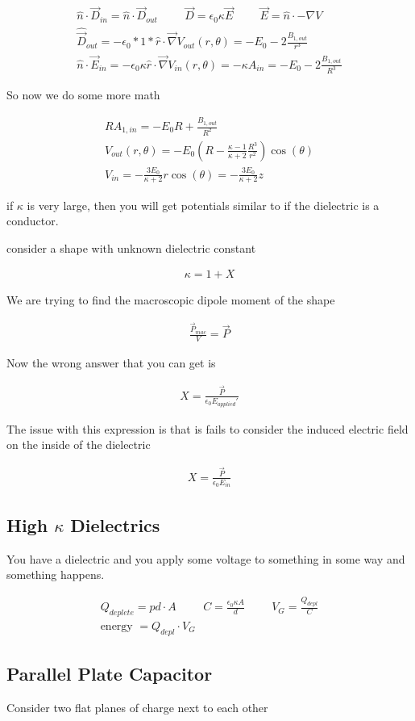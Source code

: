\documentclass[fleqn]{report}
\newcommand{\hp}{\hspace{1cm}}
\newcommand{\equations} [1] {
\begin{gather*}
#1
\end{gather*}
}
\begin{document}
\equations{
    \hat n \cdot \vec D_{in}
    =
    \hat n \cdot \vec D_{out}
    \hp    
    \vec D = \epsilon_0 \kappa \vec E
    \hp
    \vec E = \hat n \cdot - \nabla V
    \\
    \hat \vec D_{out} 
    =
    - \epsilon_0 *1*\hat r \cdot \vec \nabla V_{out}(r, \theta)
    =
    - E_0 - 2 \frac{B_{1, out}}{r^3}
    \\
    \hat n \cdot \vec E_{in} 
    = 
    - \epsilon_0 \kappa \hat r \cdot \vec \nabla V_{in}(r, \theta)
    = 
    - \kappa A_{in}
    = 
    - E_0 - 2 \frac{B_{1, out}}{R^3}
}

So now we do some more math 
\equations{
    R A_{1, in}
    = 
    -E_0 R + \frac{B_{1, out}}{R^2}
    \\
    V_{out}(r, \theta)
    =
    -E_0
    \left(
        R-
        \frac{\kappa - 1}{\kappa + 2}
        \frac{R^3}{r^2}
    \right)
    \cos(\theta) 
    \\
    V_{in}
    =
    -
    \frac{3 E_0}{\kappa + 2}
    r \cos(\theta) 
    =
    -
    \frac{3 E_0}{\kappa + 2}
    z
}
if $\kappa$ is very large, then you will get potentials similar to 
if the dielectric is a conductor. 

consider a shape with unknown dielectric constant 
\equations{
    \kappa = 1 + X
}
We are trying to find the macroscopic dipole moment of the shape 
\equations{
    \frac{\vec P_{mac}}{V} = \vec P
}

Now the wrong answer that you can get is 
\equations{
    X = \frac{\vec P}{\epsilon_0 E_{applied}'}
}
The issue with this expression is that is fails to consider the induced 
electric field on the inside of the dielectric 

\equations{
    X = \frac{\vec P}{\epsilon_0 E_{in}}
}

\subsection{High $\kappa$ Dielectrics}
You have a dielectric and you apply some voltage to something in some 
way and something happens. 

\equations{
    Q_{deplete} = p d \cdot A 
    \hp 
    C = \frac{\epsilon_0 \kappa A}{d}
    \hp 
    V_G = \frac{Q_{depl}}{C}
    \\
    \textrm{energy } = Q_{depl} \cdot V_G
}

\subsection{Parallel Plate Capacitor}
Consider two flat planes of charge next to each other 
\end{document}
